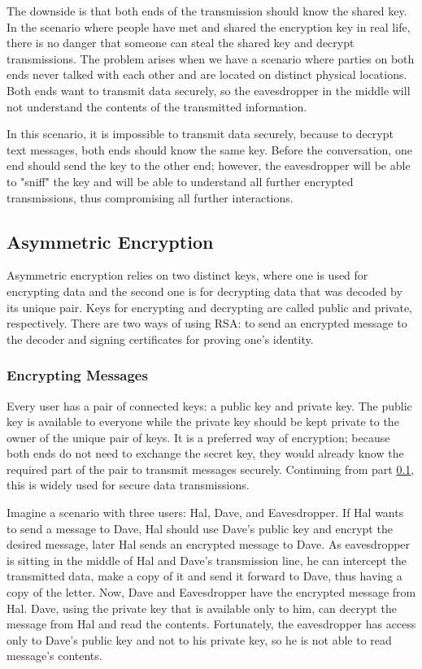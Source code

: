 \documentclass[a4paper, 12pt]{article}
\begin{document}
The downside is that both ends of the transmission should know the shared key. In the scenario where
people have met and shared the encryption key in real life, there is no danger that someone can
steal the shared key and decrypt transmissions. The problem arises when we have a scenario where
parties on both ends never talked with each other and are located on distinct physical locations.
Both ends want to transmit data securely, so the eavesdropper in the
middle will not understand the contents of the transmitted information.

In this scenario, it is
impossible to transmit data securely, because to decrypt text messages, both ends should know
the same key. Before the conversation, one end should send the key to the other end; however,
the eavesdropper will be able to "sniff" the key and will be able to understand all further encrypted
transmissions, thus compromising all further interactions.

\subsection{Asymmetric Encryption}
\label{bsec:asymmetric}

Asymmetric encryption relies on two distinct keys, where one is
used for encrypting data and the second one is for decrypting data that was decoded by its unique pair.
Keys for encrypting and decrypting are called public and private, respectively. There are two ways
of using RSA: to send an encrypted message to the decoder and signing certificates for
proving one's identity.

\subsubsection{Encrypting Messages}
\label{bbsec:encryption}

Every user has a pair of connected keys: a public key and private key. The public key is available
to everyone while the private key should be kept private to the owner of the unique pair
of keys. It is a preferred way of encryption; because both ends do not need to exchange the secret
key, they would already know the required part of the pair to transmit messages securely.
Continuing from part \ref{bsec:asymmetric}, this is widely used for secure data transmissions.

Imagine a scenario with three
users: Hal, Dave, and Eavesdropper. If Hal wants to send a message to Dave, Hal should use Dave's
public key and encrypt the desired message, later Hal sends an encrypted message to Dave. As
eavesdropper is sitting in the middle of Hal and Dave's transmission line, he can intercept the
transmitted data, make a copy of it and send it forward to Dave, thus having a copy of the letter.
Now, Dave and Eavesdropper have the encrypted message from Hal. Dave, using the private key
that is available only to him, can decrypt the message from Hal and read the contents. Fortunately,
the eavesdropper has access only to Dave's public key and not to his private key, so he is not able to read
message's contents.
\end{document}
